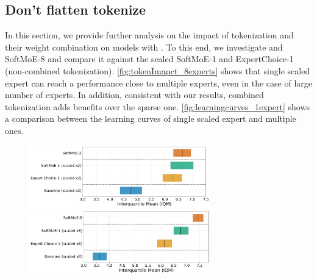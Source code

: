 \subsection{Don't flatten tokenize}
\label{appendix:don'tFlatten}
In this section, we provide further analysis on the impact of tokenization and their weight combination on models with . To this end, we investigate  and SoftMoE-8 and compare it against the scaled SoftMoE-1 and ExpertChoice-1 (non-combined tokenization). \autoref{fig:tokenImapct_8experts} shows that single scaled expert can reach a performance close to multiple experts, even in the case of large number of experts. In addition, consistent with our results, combined tokenization adds benefits over the sparse one. \autoref{fig:learningcurves_1expert} shows a comparison between the learning curves of single scaled expert and multiple ones.

\begin{figure}[h!]
    \centering
    \includegraphics[width=0.7\textwidth]{figures/results/section5_aggregate_v2_2experts.pdf}
    \vspace{-0.4cm}
    \includegraphics[width=0.7\textwidth]{figures/results/section5_aggregate_v2_8experts.pdf}
    \caption{}
    \label{fig:tokenImapct_8experts}
    \vspace{-0.2cm}
\end{figure}

